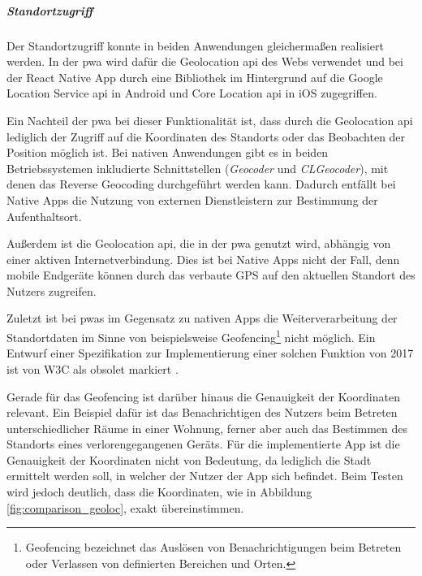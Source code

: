 \subparagraph{Standortzugriff\\}
Der Standortzugriff konnte in beiden Anwendungen gleichermaßen realisiert werden.
In der \ac{pwa} wird dafür die Geolocation \ac{api} des Webs verwendet und bei der React Native App durch eine Bibliothek im Hintergrund auf die Google Location Service \ac{api} in Android und Core Location \ac{api} in iOS zugegriffen.

Ein Nachteil der \ac{pwa} bei dieser Funktionalität ist, dass durch die Geolocation \ac{api} lediglich der Zugriff auf die Koordinaten des Standorts oder das Beobachten der Position möglich ist.
Bei nativen Anwendungen gibt es in beiden Betriebssystemen inkludierte Schnittstellen (\textit{Geocoder} und \textit{CLGeocoder}), mit denen das Reverse Geocoding durchgeführt werden kann.
Dadurch entfällt bei Native Apps die Nutzung von externen Dienstleistern zur Bestimmung der Aufenthaltsort.

Außerdem ist die Geolocation \ac{api}, die in der \ac{pwa} genutzt wird, abhängig von einer aktiven Internetverbindung.
Dies ist bei Native Apps nicht der Fall, denn mobile Endgeräte können durch das verbaute GPS auf den aktuellen Standort des Nutzers zugreifen.

Zuletzt ist bei \acp{pwa} im Gegensatz zu nativen Apps die Weiterverarbeitung der Standortdaten im Sinne von beispielsweise Geofencing\footnote{Geofencing bezeichnet das Auslösen von Benachrichtigungen beim Betreten oder Verlassen von definierten Bereichen und Orten.} nicht möglich.
Ein Entwurf einer Spezifikation zur Implementierung einer solchen Funktion von 2017 ist von W3C als obsolet markiert \cite{GeofencingAPI.2017}.

Gerade für das Geofencing ist darüber hinaus die Genauigkeit der Koordinaten relevant.
Ein Beispiel dafür ist das Benachrichtigen des Nutzers beim Betreten unterschiedlicher Räume in einer Wohnung, ferner aber auch das Bestimmen des Standorts eines verlorengegangenen Geräts.
Für die implementierte App ist die Genauigkeit der Koordinaten nicht von Bedeutung, da lediglich die Stadt ermittelt werden soll, in welcher der Nutzer der App sich befindet.
Beim Testen wird jedoch deutlich, dass die Koordinaten, wie in Abbildung \ref{fig:comparison_geoloc}, exakt übereinstimmen.

